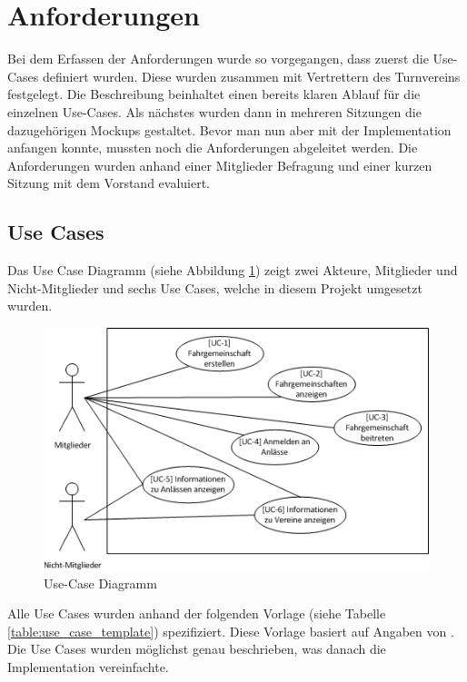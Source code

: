 \newpage
\section{Anforderungen}\label{sec.anfoderungen}
Bei dem Erfassen der Anforderungen wurde so vorgegangen, dass zuerst die Use-Cases definiert wurden. Diese wurden zusammen mit Vertrettern des Turnvereins festgelegt. Die Beschreibung beinhaltet einen bereits klaren Ablauf für die einzelnen Use-Cases. Als nächstes wurden dann in mehreren Sitzungen die dazugehörigen Mockups gestaltet. Bevor man nun aber mit der Implementation anfangen konnte, mussten noch die Anforderungen abgeleitet werden. Die Anforderungen wurden anhand einer Mitglieder Befragung und einer kurzen Sitzung mit dem Vorstand evaluiert.

\subsection{Use Cases}\label{use_cases}
Das Use Case Diagramm (siehe Abbildung \ref{fig:use_case}) zeigt zwei Akteure, Mitglieder und Nicht-Mitglieder und sechs Use Cases, welche in diesem Projekt umgesetzt wurden.
\begin{figure}[h]
\includegraphics{images/anforderungen/use_cases.png}
\caption{Use-Case Diagramm}
\label{fig:use_case}
\end{figure}

Alle Use Cases wurden anhand der folgenden Vorlage (siehe Tabelle \ref{table:use_case_template}) spezifiziert. Diese Vorlage basiert auf Angaben von \cite{req_eng_book}. Die Use Cases wurden möglichst genau beschrieben, was danach die Implementation vereinfachte.

